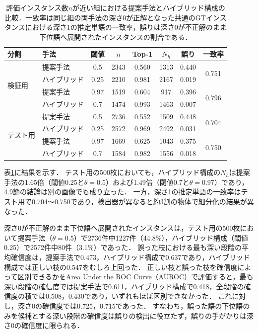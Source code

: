 \begin{table}[t]
    \centering
    \caption{評価インスタンス数$ n $が近い組における提案手法とハイブリッド構成の比較．一致率は同じ組の両手法の深さ0が正解となった共通のGTインスタンスにおける深さ1の推定単語の一致率，誤りは深さ0が不正解のまま下位語へ展開されたインスタンスの割合である．}
    \label{tab_eval_pairs}
    \footnotesize
    \setlength{\tabcolsep}{2.5pt}
    \begin{tabular}{llcccccc}
        \toprule
        分割 & 手法 & 閾値 & $ n $ & Top-1 & $ N_h $ & 誤り & 一致率 \\
        \midrule
        \multirow{4}{*}{検証用} & 提案手法     & 0.5  & 2343 & 0.560 & 1313 & 0.440 & \multirow{2}{*}{0.751} \\
                                & ハイブリッド & 0.25 & 2210 & 0.981 & 2167 & 0.019 & \\
                                & 提案手法     & 0.97 & 1519 & 0.604 & 917  & 0.396 & \multirow{2}{*}{0.796} \\
                                & ハイブリッド & 0.7  & 1474 & 0.993 & 1463 & 0.007 & \\
        \midrule
        \multirow{4}{*}{テスト用} & 提案手法     & 0.5  & 2736 & 0.552 & 1509 & 0.448 & \multirow{2}{*}{0.704} \\
                                  & ハイブリッド & 0.25 & 2572 & 0.969 & 2492 & 0.031 & \\
                                  & 提案手法     & 0.97 & 1669 & 0.625 & 1043 & 0.375 & \multirow{2}{*}{0.750} \\
                                  & ハイブリッド & 0.7  & 1584 & 0.982 & 1556 & 0.018 & \\
        \bottomrule
    \end{tabular}
\end{table}

表\ref{tab_eval_pairs}に結果を示す．
テスト用の500枚においても，ハイブリッド構成の$ N_h $は提案手法の1.65倍（閾値0.25と$ \theta = 0.5 $）および1.49倍（閾値0.7と$ \theta = 0.97 $）であり，4.9節の結論は別の画像でも成り立った．
一方，深さ1の推定単語の一致率はテスト用で0.704〜0.750であり，検出器が異なると約3割の物体で細分化の結果が異なった．

深さ0が不正解のまま下位語へ展開されたインスタンスは，テスト用の500枚において提案手法（$ \theta = 0.5 $）で2736件中1227件（44.8\%），ハイブリッド構成（閾値0.25）で2572件中80件（3.1\%）であった．
誤った枝における最も深い段階の平均確信度は，提案手法で0.473，ハイブリッド構成で0.637であり，ハイブリッド構成では正しい枝の0.547をむしろ上回った．
正しい枝と誤った枝を確信度によって区別できるかをArea Under the ROC Curve（AUROC）で評価すると，最も深い段階の確信度では提案手法で0.611，ハイブリッド構成で0.418，全段階の確信度の積では0.508，0.430であり，いずれもほぼ区別できなかった．
これに対し，深さ0の確信度では0.725，0.715であった．
すなわち，誤った語の下位語のみを候補とする深い段階の確信度は誤りの検出に役立たず，誤りの手がかりは深さ0の確信度に限られる．

